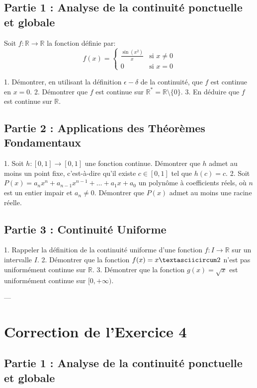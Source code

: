\documentclass[12pt,a4paper]{report}
\begin{document}
\subsection{Partie 1 : Analyse de la continuité ponctuelle et globale}

Soit $f: \mathbb{R} \to \mathbb{R}$ la fonction définie par:
$$ f(x) = \begin{cases} \frac{\sin(x^2)}{x} & \text{si } x \neq 0 \\ 0 & \text{si } x = 0 \end{cases} $$

1.  Démontrer, en utilisant la définition $\epsilon-\delta$ de la continuité, que $f$ est continue en $x=0$.
2.  Démontrer que $f$ est continue sur $\mathbb{R}^* = \mathbb{R} \setminus \{0\}$.
3.  En déduire que $f$ est continue sur $\mathbb{R}$.

\subsection{Partie 2 : Applications des Théorèmes Fondamentaux}

1.  Soit $h: [0, 1] \to [0, 1]$ une fonction continue. Démontrer que $h$ admet au moins un point fixe, c'est-à-dire qu'il existe $c \in [0, 1]$ tel que $h(c) = c$.
2.  Soit $P(x) = a_n x^n + a_{n-1} x^{n-1} + \dots + a_1 x + a_0$ un polynôme à coefficients réels, où $n$ est un entier impair et $a_n \neq 0$. Démontrer que $P(x)$ admet au moins une racine réelle.

\subsection{Partie 3 : Continuité Uniforme}

1.  Rappeler la définition de la continuité uniforme d'une fonction $f: I \to \mathbb{R}$ sur un intervalle $I$.
2.  Démontrer que la fonction $f(x) = x\textasciicircum 2$ n'est pas uniformément continue sur $\mathbb{R}$.
3.  Démontrer que la fonction $g(x) = \sqrt{x}$ est uniformément continue sur $[0, +\infty)$.

---

\section{Correction de l'Exercice 4}

\subsection{Partie 1 : Analyse de la continuité ponctuelle et globale}
\end{document}
